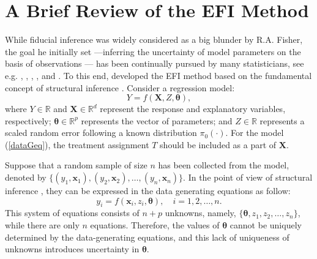 \documentclass[11pt]{article}
\newcommand{\bX}{{\boldsymbol X}}
\newcommand{\bx}{{\boldsymbol x}}
\newcommand{\btheta}{{\boldsymbol \theta}}
\begin{document}
 



  
 \section{A Brief Review of the EFI Method} \label{sect:EFI}


While fiducial inference was widely considered as a big blunder by R.A. Fisher, the goal he initially set ---inferring the uncertainty of model parameters on the basis of observations --- has been continually pursued by many statisticians, see e.g. \cite{Zabell1992Fisher},  \cite{hannig2009gfi}, \cite{hannig2016gfi},  \cite{Murph2022GeneralizedFI}, and \cite{Martin2023FiducialIV}.
To this end, \cite{LiangKS2024EFI} 
developed the EFI method based on the fundamental concept of structural inference 
\citep{Fraser1966StructuralPA,Fraser1968Book}. 
Consider a regression model: 
\begin{equation} \label{modeleq}
Y=f(\bX,Z,\btheta), 
\end{equation}
where $Y\in \mathbb{R}$ and $\bX\in \mathbb{R}^{d}$ represent the response and explanatory variables, respectively; $\btheta\in \mathbb{R}^p$ represents the vector of  parameters; 
and $Z\in \mathbb{R}$ represents a scaled random error following  
 a known distribution $\pi_0(\cdot)$.  
 For the model (\ref{dataGeq}),  the treatment assignment $T$ should be included as a part of $\bX$. 

Suppose that a random sample of size $n$ has been collected from the model, denoted by $\{(y_1,\bx_1), (y_2,\bx_2),\ldots,(y_n,\bx_n)\}$. In the point of view of structural inference \textcolor{black}{ \citep{Fraser1966StructuralPA,Fraser1968Book}}, they can be expressed in the data generating equations as follow:  
\begin{equation} \label{dataGeneqg}
y_i=f(\bx_i,z_i,\btheta), \quad i=1,2,\ldots,n.
\end{equation}
This system of equations consists of $n+p$ unknowns, namely, $\{\btheta, z_1, z_2, \ldots, z_n
\}$, while there are only $n$ equations. Therefore, the values of $\btheta$ cannot be uniquely determined by the data-generating equations, and this lack of uniqueness of unknowns introduces uncertainty in $\btheta$.  
\end{document}
